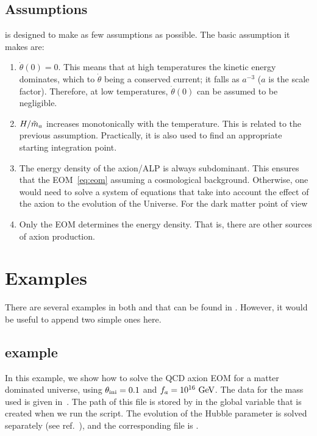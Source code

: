\documentclass[a4paper,11pt]{article}
\begin{document}
	\subsection{Assumptions}
	\mimes is designed to make as few assumptions as possible. The basic assumption it makes are:
	\begin{enumerate}
		\item $\dot \theta(0)=0$. This means that at high temperatures the kinetic energy dominates, which to $\dot \theta$ being a conserved current; \ie it falls as $a^{-3}$ ($a$ is the scale factor). Therefore, at low temperatures, $\dot \theta(0)$ can be assumed to be negligible.   
		\item $H/\tilde m_{a}{}$ increases monotonically with the temperature. This is related to the previous assumption. Practically, it is also used to find an appropriate starting integration point. 
		\item The energy density of the axion/ALP is always subdominant. This ensures that the EOM~\ref{eq:eom} assuming a  cosmological background. Otherwise, one would need to solve a system of
		equations that take into account the effect of the axion to the evolution of the Universe. For the dark matter point of view  
		\item Only the EOM determines the energy density. That is, there are other sources of axion production.
	\end{enumerate}	
	
	
\section{Examples}
%
	There are several examples in both \CPP and \PY that can be found in . However, it would be useful to append two simple ones here.
	
	\subsection{\CPP example}
	In this example, we show how to solve the QCD axion EOM for a matter dominated universe, using $\theta_{\rm ini}{}=0.1$ and $f_{a}{}=10^{16}~{\rm GeV}$. The data for the mass used is given in~\cite{Borsanyi:2016ksw}. The path of this file is stored by in the global variable  that is created when we run the  script.	The evolution of the Hubble parameter is solved separately (see \eg ref.~\cite{Arias:2020qty}), and the corresponding file is .   
	
\end{document}
